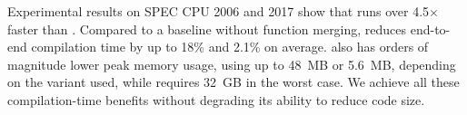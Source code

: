 Experimental results on SPEC CPU 2006 and 2017 show that {\ProjName} runs over 4.5$\times$ faster than {\SOAName}.
Compared to a baseline without function merging, {\ProjName} reduces end-to-end compilation time by up to 18\% and 2.1\% on average.
{\ProjName} also has orders of magnitude lower peak memory usage, using up to 48~MB or 5.6~MB, depending on the variant used, while {\SOAName} requires 32~GB in the worst case.
We achieve all these compilation-time benefits without degrading its ability to reduce code size.